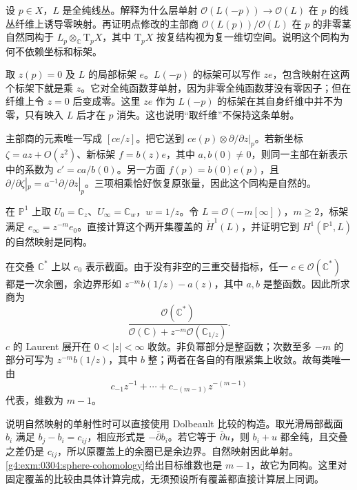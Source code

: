\BookExercises

\begin{exercise}
	\label{g4:ex:0301:fiber-modification}
	设 \(p\in X\)，\(L\) 是全纯线丛。解释为什么层单射 \(\mathcal O(L(-p))\to\mathcal O(L)\) 在 \(p\) 的线丛纤维上诱导零映射。再证明点修改的主部商 \(\mathcal O(L(p))/\mathcal O(L)\) 在 \(p\) 的非零茎自然同构于 \(L_p\otimes_{\mathbb C}\mathrm{T}_pX\)，其中 \(\mathrm{T}_pX\) 按复结构视为复一维切空间。说明这个同构为何不依赖坐标和标架。
\end{exercise}
\begin{solution}
	取 \(z(p)=0\) 及 \(L\) 的局部标架 \(e\)。\(L(-p)\) 的标架可以写作 \(ze\)，包含映射在这两个标架下就是乘 \(z\)。它对全纯函数芽单射，因为非零全纯函数芽没有零因子；但在纤维上令 \(z=0\) 后变成零。这里 \(ze\) 作为 \(L(-p)\) 的标架在其自身纤维中并不为零，只有映入 \(L\) 后才在 \(p\) 消失。这也说明“取纤维”不保持这条单射。

	主部商的元素唯一写成 \([c e/z]\)。把它送到 \(c e(p)\otimes\partial/\partial z|_p\)。若新坐标 \(\zeta=a z+O(z^2)\)、新标架 \(f=b(z)e\)，其中 \(a,b(0)\ne0\)，则同一主部在新表示中的系数为 \(c'=ca/b(0)\)。另一方面 \(f(p)=b(0)e(p)\)，且 \(\partial/\partial\zeta|_p=a^{-1}\partial/\partial z|_p\)。三项相乘恰好恢复原张量，因此这个同构是自然的。
\end{solution}

\begin{exercise}
	\label{g4:ex:0302:sphere-cech}
	在 \(\mathbb P^1\) 上取 \(U_0=\mathbb C_z\)、\(U_\infty=\mathbb C_w\)，\(w=1/z\)。令 \(L=\mathcal O(-m[\infty])\)，\(m\ge2\)，标架满足 \(e_\infty=z^{-m}e_0\)。直接计算这个两开集覆盖的 \(\check H^1(L)\)，并证明它到 \(H^1(\mathbb P^1,L)\) 的自然映射是同构。
\end{exercise}
\begin{solution}
	在交叠 \(\mathbb C^*\) 上以 \(e_0\) 表示截面。由于没有非空的三重交替指标，任一 \(c\in\mathcal O(\mathbb C^*)\) 都是一次余圈，余边界形如 \(z^{-m}b(1/z)-a(z)\)，其中 \(a,b\) 是整函数。因此所求商为
	\[
		\frac{\mathcal O(\mathbb C^*)}{\mathcal O(\mathbb C)+z^{-m}\mathcal O(\mathbb C_{1/z})}.
	\]
	\(c\) 的 Laurent 展开在 \(0<|z|<\infty\) 收敛。非负幂部分是整函数；次数至多 \(-m\) 的部分可写为 \(z^{-m}b(1/z)\)，其中 \(b\) 整；两者在各自的有限紧集上收敛。故每类唯一由
	\[
		c_{-1}z^{-1}+\cdots+c_{-(m-1)}z^{-(m-1)}
	\]
	代表，维数为 \(m-1\)。

	说明自然映射的单射性时可以直接使用 Dolbeault 比较的构造。取光滑局部截面 \(b_i\) 满足 \(b_j-b_i=c_{ij}\)，相应形式是 \(-\bar\partial b_i\)。若它等于 \(\bar\partial u\)，则 \(b_i+u\) 都全纯，且交叠之差仍是 \(c_{ij}\)，所以原覆盖上的余圈已是余边界。自然映射因此单射。\cref{g4:exm:0304:sphere-cohomology}给出目标维数也是 \(m-1\)，故它为同构。这里对固定覆盖的比较由具体计算完成，无须预设所有覆盖都直接计算层上同调。
\end{solution}

